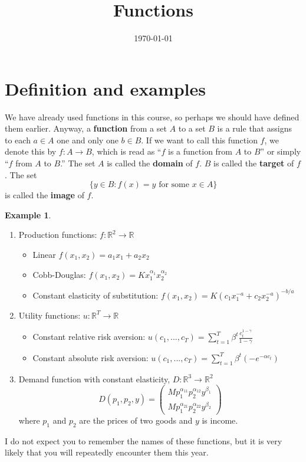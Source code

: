 \documentclass[12pt,reqno]{amsart}
\title{Functions}
\date{\today}
\theoremstyle{definition}
\newtheorem{example}{Example}[section]
\def\R{\mathbb{R}}
\renewcommand{\to}{{\rightarrow}}
\begin{document}
\maketitle

\section{Definition and examples}

 We have already used functions in this course, so perhaps we should
have defined them earlier. Anyway, a \textbf{function} from a set $A$
to a set $B$ is a rule that assigns to each $a \in A$ one and only one
$b \in B$. If we want to call this function $f$, we denote this by
$f:A \to B$, which is read as ``$f$ is a function from $A$ to $B$'' or
simply ``$f$ from $A$ to $B$.'' The set $A$ is called the
\textbf{domain} of $f$. $B$ is called the \textbf{target} of $f$. The
set 
\[ \{y  \in B:  f(x) = y \text{ for some } x \in A \} \]
is called the \textbf{image} of $f$. 


\begin{example}
\begin{enumerate}
\item Production functions: $f:\R^2 \to \R$ 
  \begin{itemize}
  \item Linear $ f(x_1,x_2) = a_1 x_1 + a_2 x_2 $
  \item Cobb-Douglas: $f(x_1,x_2) = K x_1^{\alpha_1} x_2^{\alpha_2}$
  \item Constant elasticity of substitution: $f(x_1,x_2) = K (c_1
    x_1^{-a} + c_2 x_2^{-a})^{-b/a}$
  \end{itemize}
\item Utility functions: $u: \R^T \to \R$
  \begin{itemize}
  \item Constant relative risk aversion: $u(c_1,...,c_T) =
    \sum_{t=1}^T \beta^t \frac{c_t^{1-\gamma}}{1-\gamma}$
  \item Constant absolute risk aversion: $u(c_1,...,c_T) =
    \sum_{t=1}^T \beta^t (-e^{-\alpha c_t})$
  \end{itemize}
\item Demand function with constant elasticity,  $D:\R^3 \to \R^2$
  \[ D(p_1,p_2,y) = \begin{pmatrix} M p_1^{\alpha_{11}}
    p_2^{\alpha_{12}} y^{\beta_1} \\
    M p_1^{\alpha_{21}} p_2^{\alpha_{22}} y^{\beta_2}
  \end{pmatrix}
  \]  
  where $p_1$ and $p_2$ are the prices of two goods and $y$ is income.
\end{enumerate}
I do not expect you to remember the names of these functions, but it
is very likely that you will repeatedly encounter them this year. 
\end{example}
\end{document}
